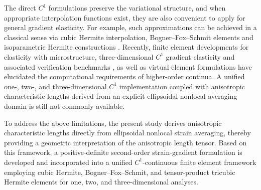 \documentclass[final,3p,times,fleqn]{elsarticle}
\begin{document}
The direct $C^{1}$ formulations preserve the variational structure, and when appropriate interpolation functions exist, they are also convenient to apply for general gradient elasticity. For example, such approximations can be achieved in a classical sense via cubic Hermite interpolation, Bogner--Fox--Schmit elements and isoparametric Hermite constructions \cite{BognerFoxSchmit1966,PeteraPittman1994}. Recently, finite element developments for elasticity with microstructure, three-dimensional $C^{1}$ gradient elasticity and associated verification benchmarks \cite{Zervos2008,Papanicolopulos2009}, as well as virtual element formulations \cite{Yang2021,WriggersHudobivnik2023} have elucidated the computational requirements of higher-order continua. A unified one-, two-, and three-dimensional $C^{1}$ implementation coupled with anisotropic characteristic lengths derived from an explicit ellipsoidal nonlocal averaging domain is still not commonly available.

To address the above limitations, the present study derives anisotropic characteristic lengths directly from ellipsoidal nonlocal strain averaging, thereby providing a geometric interpretation of the anisotropic length tensor. Based on this framework, a positive-definite second-order strain-gradient formulation is developed and incorporated into a unified $C^{1}$-continuous finite element framework employing cubic Hermite, Bogner--Fox--Schmit, and tensor-product tricubic Hermite elements for one, two, and three-dimensional analyses.
\end{document}
